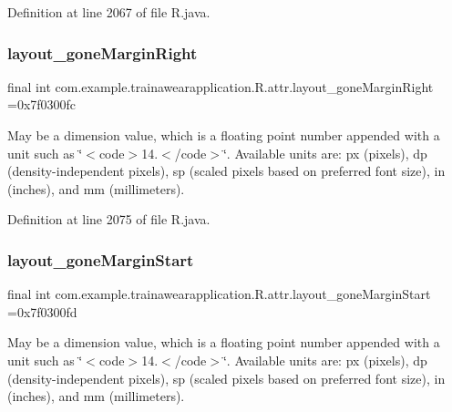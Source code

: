 Definition at line 2067 of file R.\+java.

\mbox{\label{classcom_1_1example_1_1trainawearapplication_1_1_r_1_1attr_a55cb89b09c81ad684916c8cbb29fa7a7}} 
\subsubsection{\texorpdfstring{layout\_goneMarginRight}{layout\_goneMarginRight}}
{\footnotesize\ttfamily final int com.\+example.\+trainawearapplication.\+R.\+attr.\+layout\+\_\+gone\+Margin\+Right =0x7f0300fc\hspace{0.3cm}{\ttfamily [static]}}

May be a dimension value, which is a floating point number appended with a unit such as \char`\"{}$<$code$>$14.\+5sp$<$/code$>$\char`\"{}. Available units are\+: px (pixels), dp (density-\/independent pixels), sp (scaled pixels based on preferred font size), in (inches), and mm (millimeters). 

Definition at line 2075 of file R.\+java.

\mbox{\label{classcom_1_1example_1_1trainawearapplication_1_1_r_1_1attr_ae038797bb9a948a8fcf94912949742d5}} 
\subsubsection{\texorpdfstring{layout\_goneMarginStart}{layout\_goneMarginStart}}
{\footnotesize\ttfamily final int com.\+example.\+trainawearapplication.\+R.\+attr.\+layout\+\_\+gone\+Margin\+Start =0x7f0300fd\hspace{0.3cm}{\ttfamily [static]}}

May be a dimension value, which is a floating point number appended with a unit such as \char`\"{}$<$code$>$14.\+5sp$<$/code$>$\char`\"{}. Available units are\+: px (pixels), dp (density-\/independent pixels), sp (scaled pixels based on preferred font size), in (inches), and mm (millimeters). 

